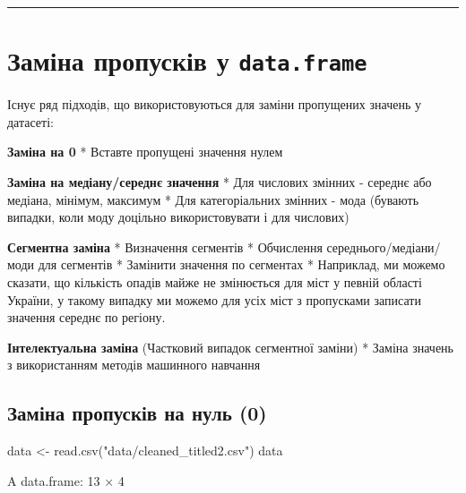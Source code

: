 \documentclass[
  letterpaper,
  DIV=11,
  numbers=noendperiod]{scrreprt}
\newenvironment{Shaded}{\begin{snugshade}}{\end{snugshade}}
\newcommand{\FunctionTok}[1]{\textcolor[rgb]{0.28,0.35,0.67}{#1}}
\newcommand{\NormalTok}[1]{\textcolor[rgb]{0.00,0.23,0.31}{#1}}
\newcommand{\OtherTok}[1]{\textcolor[rgb]{0.00,0.23,0.31}{#1}}
\newcommand{\StringTok}[1]{\textcolor[rgb]{0.13,0.47,0.30}{#1}}
\begin{document}
\begin{center}\rule{0.5\linewidth}{0.5pt}\end{center}

\section{\texorpdfstring{Заміна пропусків у
\texttt{data.frame}}{Заміна пропусків у data.frame}}\label{ux437ux430ux43cux456ux43dux430-ux43fux440ux43eux43fux443ux441ux43aux456ux432-ux443-data.frame}

Існує ряд підходів, що використовуються для заміни пропущених значень у
датасеті:

\textbf{Заміна на 0} * Вставте пропущені значення нулем

\textbf{Заміна на медіану/середнє значення} * Для числових змінних -
середнє або медіана, мінімум, максимум * Для категоріальних змінних -
мода (бувають випадки, коли моду доцільно використовувати і для
числових)

\textbf{Сегментна заміна} * Визначення сегментів * Обчислення
середнього/медіани/моди для сегментів * Замінити значення по сегментах *
Наприклад, ми можемо сказати, що кількість опадів майже не змінюється
для міст у певній області України, у такому випадку ми можемо для усіх
міст з пропусками записати значення середнє по регіону.

\textbf{Інтелектуальна заміна} (Частковий випадок сегментної заміни) *
Заміна значень з використанням методів машинного навчання

\subsection{Заміна пропусків на нуль
(0)}\label{ux437ux430ux43cux456ux43dux430-ux43fux440ux43eux43fux443ux441ux43aux456ux432-ux43dux430-ux43dux443ux43bux44c-0}

\begin{Shaded}
\begin{Highlighting}[]
\NormalTok{data }\OtherTok{\textless{}{-}} \FunctionTok{read.csv}\NormalTok{(}\StringTok{"data/cleaned\_titled2.csv"}\NormalTok{)}
\NormalTok{data}
\end{Highlighting}
\end{Shaded}

A data.frame: 13 × 4
\end{document}
